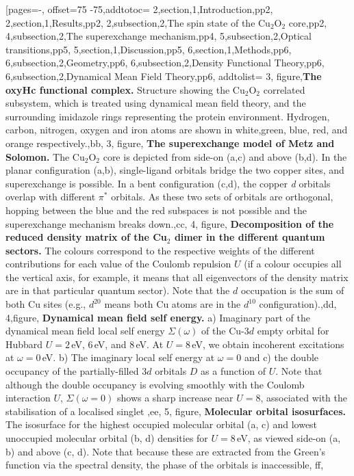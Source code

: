 [pages=-, offset=75 -75,addtotoc={
     2,section,1,Introduction,pp2,
     2,section,1,Results,pp2,
     2,subsection,2,The spin state of the Cu$_2$O$_2$ core,pp2,
     4,subsection,2,The superexchange mechanism,pp4,
     5,subsection,2,Optical transitions,pp5,
     5,section,1,Discussion,pp5,
     6,section,1,Methods,pp6,
     6,subsection,2,Geometry,pp6,
     6,subsection,2,Density Functional Theory,pp6,
     6,subsection,2,Dynamical Mean Field Theory,pp6},
     addtolist={
     3, figure,{\textbf{The oxyHc functional complex.} Structure showing the Cu$_2$O$_2$ correlated subsystem, which is treated using dynamical mean field theory, and the surrounding imidazole rings representing the protein environment. Hydrogen, carbon, nitrogen, oxygen and iron atoms are shown in white,green, blue, red, and orange respectively.},bb,
     3, figure, {\textbf{The superexchange model of Metz and Solomon.} The Cu$_2$O$_2$ core is depicted from side-on (a,c) and above (b,d). In the planar configuration (a,b), single-ligand orbitals bridge the two copper sites, and superexchange is possible. In a bent configuration (c,d), the copper \textit{d} orbitals overlap with different $\pi^{\ast}$ orbitals. As these two sets of orbitals are orthogonal, hopping between the blue and the red subspaces is not possible and the superexchange mechanism breaks down.},cc,
     4, figure, {\textbf{Decomposition of the reduced density matrix of the Cu$_2$ dimer in the different quantum sectors.} The colours correspond to the respective weights of the different contributions for each value of the Coulomb repulsion $U$ (if a colour occupies all the vertical axis, for example, it means that all eigenvectors of the density matrix are in that particular quantum sector). Note that the $d$ occupation is the sum of both Cu sites (e.g., $d^{20}$ means both Cu atoms are in the $d^{10}$ configuration).},dd,
     4,figure, { \textbf{Dynamical mean field self energy.} a) Imaginary part of the dynamical mean field local self energy $\Sigma(\omega)$ of the Cu-$3d$ empty orbital for Hubbard $U=2$\,eV, $6$\,eV, and $8$\,eV. At $U=8$\,eV, we obtain incoherent excitations at $\omega=0$\,eV. b) The imaginary local self energy at $\omega=0$ and c) the double occupancy of the partially-filled $3d$ orbitals $D$ as a function of $U$. Note that although the double occupancy is evolving smoothly with the Coulomb interaction $U$, $\Sigma(\omega=0)$ shows a sharp increase near $U=8$, associated with the stabilisation of a localised singlet },ee,
     5, figure, { \textbf{Molecular orbital isosurfaces.} The isosurface for the highest occupied molecular orbital (a, c) and lowest unoccupied molecular orbital (b, d) densities for $U = 8$\,eV, as viewed side-on (a, b) and above (c, d). Note that because these are extracted from the Green's function via the spectral density, the phase of the orbitals is inaccessible}, ff,
}
